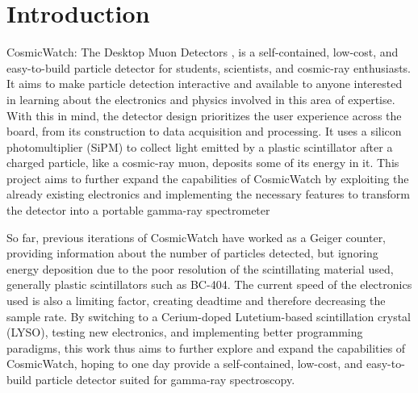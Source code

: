 \chapter{Introduction}

CosmicWatch: The Desktop Muon Detectors \cite{axani2019physics}, is a self-contained, low-cost, and easy-to-build particle detector for students, scientists, and cosmic-ray enthusiasts. It aims to make particle detection interactive and available to anyone interested in learning about the electronics and physics involved in this area of expertise. With this in mind, the detector design prioritizes the user experience across the board, from its construction to data acquisition and processing. It uses a silicon photomultiplier (SiPM) to collect light emitted by a plastic scintillator after a charged particle, like a cosmic-ray muon, deposits some of its energy in it. This project aims to further expand the capabilities of CosmicWatch by exploiting the already existing electronics and implementing the necessary features to transform the detector into a portable gamma-ray spectrometer

So far, previous iterations of CosmicWatch have worked as a Geiger counter, providing information about the number of particles detected, but ignoring energy deposition due to the poor resolution of the scintillating material used, generally plastic scintillators such as BC-404. The current speed of the electronics used is also a limiting factor, creating deadtime and therefore decreasing the sample rate. By switching to a Cerium-doped Lutetium-based scintillation crystal (LYSO), testing new electronics, and implementing better programming paradigms, this work thus aims to further explore and expand the capabilities of CosmicWatch, hoping to one day provide a self-contained, low-cost, and easy-to-build particle detector suited for gamma-ray spectroscopy.